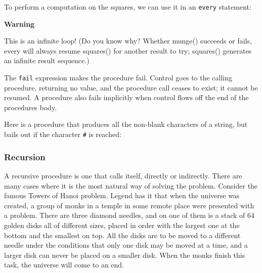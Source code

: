 To perform a computation on the squares, we can use it in an
\texttt{every} statement:


{\sffamily\bfseries
Warning}

{\sffamily
This is an infinite loop! (Do you know why? Whether munge() succeeds or
fails, \textrm{every} will always resume squares() for another result
to try; squares() generates an infinite result sequence.)}

The \texttt{fail} expression makes the
procedure fail. Control goes to the calling procedure, returning
no value, and the procedure call ceases to exist; it cannot be
resumed. A procedure also fails implicitly when control flows off the
end of the procedure{\textquotesingle}s body.

Here is a procedure that produces all the non-blank characters of a
string, but bails out if the character \texttt{\#} is reached:


\subsubsection[Recursion]{Recursion}

A recursive procedure is one that calls itself,
directly or indirectly. There are many cases where it is the most
natural way of solving the problem. Consider the famous
{\textquotedbl}Towers of Hanoi{\textquotedbl} problem.
Legend has it that when the universe was created, a group of monks
in a temple in some remote place were presented with a problem.
There are three diamond needles, and on one of them is a
stack of 64 golden disks all of different sizes, placed in
order with the largest one at the bottom and the smallest on top. All
the disks are to be moved to a different needle under the conditions
that only one disk may be moved at a time, and a larger disk can never
be placed on a smaller disk. When the monks finish this task, the
universe will come to an end.

